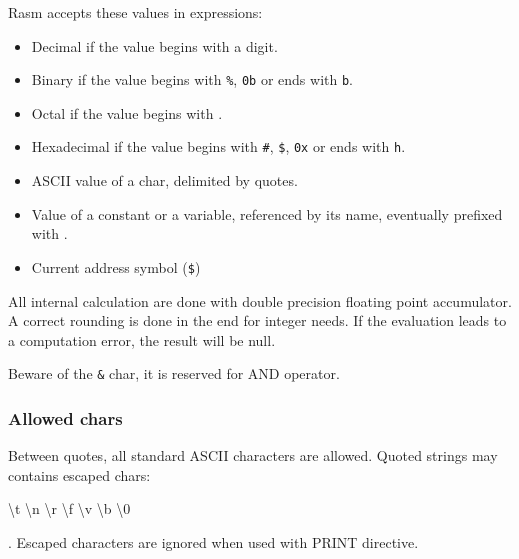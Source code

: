\begin{xen}
Rasm accepts these values in expressions:
\begin{itemize}
  \item Decimal if the value begins with a digit.
  \item Binary if the value begins with \texttt{\%}, \texttt{0b} or ends with \texttt{b}.
  \item Octal if the value begins with \texttt{\at}.
  \item Hexadecimal if the value begins with \texttt{\#}, \texttt{\$}, \texttt{0x} or ends with \texttt{h}.
  \item ASCII value of a char, delimited by quotes.
  \item Value of a constant or a variable, referenced by its name, eventually prefixed with \texttt{\at}.
  \item Current address symbol (\texttt{\$})
\end{itemize}

All internal calculation are done with double precision floating point accumulator.
A correct rounding is done in the end for integer needs.
If the evaluation leads to a computation error, the result will be null.

Beware of the \texttt{\&} char, it is reserved for AND operator.

\subsubsection{Allowed chars}
Between quotes, all standard ASCII characters are allowed.
Quoted strings may contains escaped chars: \begin{ttfamily} \textbackslash t \textbackslash n  \textbackslash r \textbackslash f \textbackslash v \textbackslash b \textbackslash 0 \end{ttfamily}.
Escaped characters are ignored when used with PRINT directive.


\end{xen}

\subsection{}

